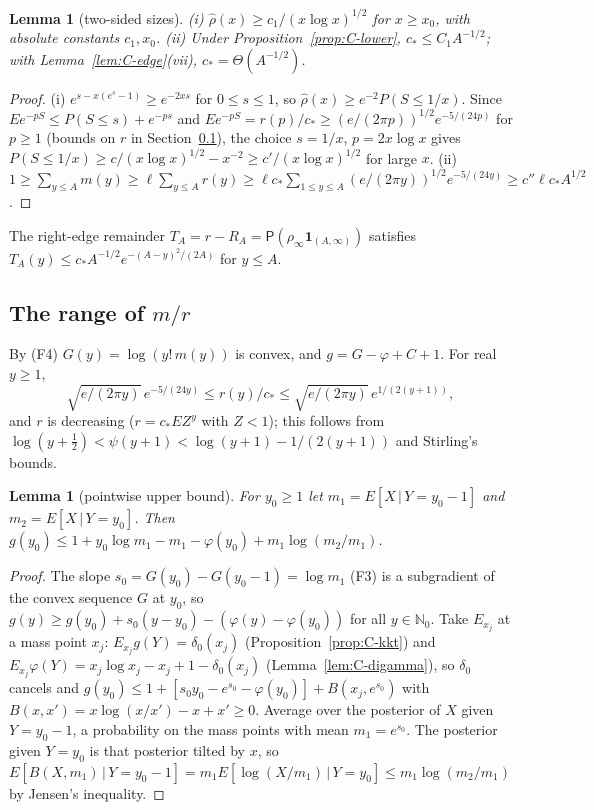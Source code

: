 \documentclass[10pt,letterpaper]{article}
\newtheorem{lemma}[theorem]{Lemma}
\begin{document}
\begin{lemma}[two-sided sizes]\label{lem:C-sizes}
(i) $\hat\rho(x)\ge c_1/(x\log x)^{1/2}$ for $x\ge x_0$, with absolute constants $c_1,x_0$.
(ii) Under Proposition~\ref{prop:C-lower}, $c_*\le C_1A^{-1/2}$; with Lemma~\ref{lem:C-edge}(vii), $c_*=\Theta(A^{-1/2})$.
\end{lemma}
\begin{proof}
(i) $e^{s-x(e^s-1)}\ge e^{-2xs}$ for $0\le s\le1$, so $\hat\rho(x)\ge e^{-2}P(S\le1/x)$. Since $Ee^{-pS}\le P(S\le s)+e^{-ps}$ and
$Ee^{-pS}=r(p)/c_*\ge(e/(2\pi p))^{1/2}e^{-5/(24p)}$ for $p\ge1$ (bounds on $r$ in Section~\ref{sec:C-range}), the choice $s=1/x$,
$p=2x\log x$ gives $P(S\le1/x)\ge c/(x\log x)^{1/2}-x^{-2}\ge c'/(x\log x)^{1/2}$ for large $x$.
(ii) $1\ge\sum_{y\le A}m(y)\ge\ell\sum_{y\le A}r(y)\ge\ell c_*\sum_{1\le y\le A}(e/(2\pi y))^{1/2}e^{-5/(24y)}\ge c''\ell c_*A^{1/2}$.
\end{proof}

The right-edge remainder $T_A=r-R_A=\mathsf P(\rho_\infty\mathbf 1_{(A,\infty)})$ satisfies $T_A(y)\le c_*A^{-1/2}e^{-(A-y)^2/(2A)}$
for $y\le A$.

\subsection{The range of $m/r$}\label{sec:C-range}

By (F4) $G(y)=\log(y!\,m(y))$ is convex, and $g=G-\varphi+C+1$. For real $y\ge1$,
\[
\sqrt{e/(2\pi y)}\,e^{-5/(24y)}\le r(y)/c_*\le\sqrt{e/(2\pi y)}\,e^{1/(2(y+1))},
\]
and $r$ is decreasing ($r=c_*EZ^y$ with $Z<1$); this follows from $\log(y+\tfrac12)<\psi(y+1)<\log(y+1)-1/(2(y+1))$ and Stirling's
bounds.

\begin{lemma}[pointwise upper bound]\label{lem:C-pointwise}
For $y_0\ge1$ let $m_1=E[X\,|\,Y=y_0-1]$ and $m_2=E[X\,|\,Y=y_0]$. Then
$g(y_0)\le1+y_0\log m_1-m_1-\varphi(y_0)+m_1\log(m_2/m_1)$.
\end{lemma}
\begin{proof}
The slope $s_0=G(y_0)-G(y_0-1)=\log m_1$ (F3) is a subgradient of the convex sequence $G$ at $y_0$, so
$g(y)\ge g(y_0)+s_0(y-y_0)-(\varphi(y)-\varphi(y_0))$ for all $y\in\mathbb N_0$. Take $E_{x_j}$ at a mass point $x_j$:
$E_{x_j}g(Y)=\delta_0(x_j)$ (Proposition~\ref{prop:C-kkt}) and $E_{x_j}\varphi(Y)=x_j\log x_j-x_j+1-\delta_0(x_j)$
(Lemma~\ref{lem:C-digamma}), so $\delta_0$ cancels and $g(y_0)\le1+[s_0y_0-e^{s_0}-\varphi(y_0)]+B(x_j,e^{s_0})$ with
$B(x,x')=x\log(x/x')-x+x'\ge0$. Average over the posterior of $X$ given $Y=y_0-1$, a probability on the mass points with mean
$m_1=e^{s_0}$. The posterior given $Y=y_0$ is that posterior tilted by $x$, so $E[B(X,m_1)\,|\,Y=y_0-1]=m_1E[\log(X/m_1)\,|\,Y=y_0]
\le m_1\log(m_2/m_1)$ by Jensen's inequality.
\end{proof}
\end{document}
